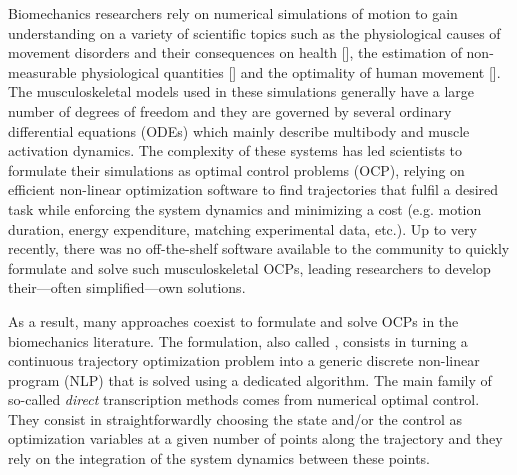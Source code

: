 Biomechanics researchers rely on numerical simulations of motion to gain understanding on a variety of scientific topics such as the physiological causes of movement disorders and their consequences on health [\addref], the estimation of non-measurable physiological quantities [\addref] and the optimality of human movement [\addref].
The musculoskeletal models used in these simulations generally have a large number of degrees of freedom and they are governed by several ordinary differential equations (ODEs) which mainly describe multibody and muscle activation dynamics.
The complexity of these systems has led scientists to formulate their simulations as optimal control problems (OCP), relying on efficient non-linear optimization software to find trajectories that fulfil a desired task while enforcing the system dynamics and minimizing a cost (e.g. motion duration, energy expenditure, matching experimental data, etc.).
Up to very recently, there was no off-the-shelf software available to the community to quickly formulate and solve such musculoskeletal OCPs, leading researchers to develop their---often simplified---own solutions.


As a result, many approaches coexist to formulate and solve OCPs in the biomechanics literature. 
The formulation, also called , consists in turning a continuous trajectory optimization problem into a generic discrete non-linear program (NLP) that is solved using a dedicated algorithm. 
The main family of so-called \textit{direct} transcription methods comes from numerical optimal control. 
They consist in straightforwardly choosing the state and/or the control as optimization variables at a given number of points along the trajectory and they rely on the integration of the system dynamics between these points. 

